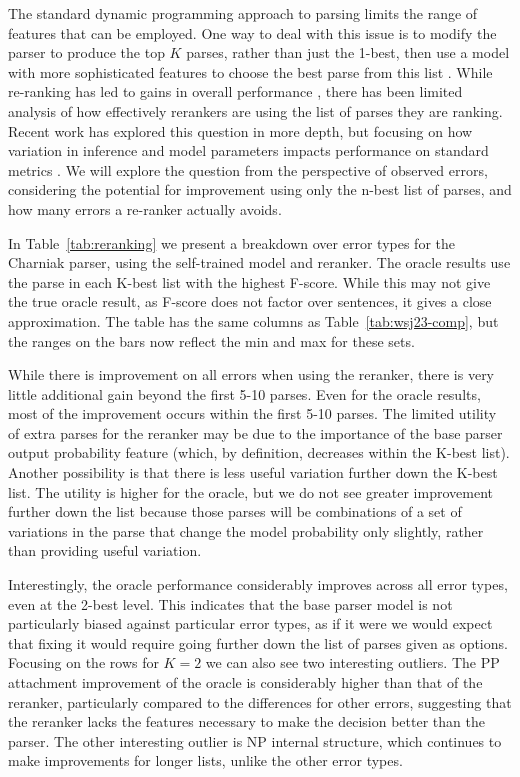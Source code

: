 The standard dynamic programming approach to parsing limits the range of features that can be employed.
One way to deal with this issue is to modify the parser to produce the top $K$ parses, rather than just the 1-best, then use a model with more sophisticated features to choose the best parse from this list \parencite{collins:00}.
While re-ranking has led to gains in overall performance \parencite{Charniak-Johnson:2005}, there has been limited analysis of how effectively rerankers are using the list of parses they are ranking.
Recent work has explored this question in more depth, but focusing on how variation in inference and model parameters impacts performance on standard metrics \parencite{huang:08a,Ng-etal:2010,Auli-Lopez:2011,Ng-Curran:2012}.
We will explore the question from the perspective of observed errors, considering the potential for improvement using only the n-best list of parses, and how many errors a re-ranker actually avoids.

In Table~\ref{tab:reranking} we present a breakdown over error types for the
Charniak parser, using the self-trained model and reranker.  The oracle results
use the parse in each K-best list with the highest F-score.  While this may not
give the true oracle result, as F-score does not factor over sentences, it
gives a close approximation.  The table has the same columns as
Table~\ref{tab:wsj23-comp}, but the ranges on the bars now reflect the min and
max for these sets.

While there is improvement on all errors when using the reranker, there is very
little additional gain beyond the first 5-10 parses.  Even for the oracle
results, most of the improvement occurs within the first 5-10 parses.  The
limited utility of extra parses for the reranker may be due to the importance
of the base parser output probability feature (which, by definition, decreases
within the K-best list).
Another possibility is that there is less useful variation further down the K-best list.
The utility is higher for the oracle, but we do not see greater improvement further down the list because those parses will be combinations of a set of variations in the parse that change the model probability only slightly, rather than providing useful variation.

Interestingly, the oracle performance considerably improves across all error types, even at the 2-best level.
This indicates that the base parser model is not particularly biased against particular error types, as if it were we would expect that fixing it would require going further down the list of parses given as options.
Focusing on the rows for $K=2$ we
can also see two interesting outliers.  The PP attachment improvement of the
oracle is considerably higher than that of the reranker, particularly compared
to the differences for other errors, suggesting that the reranker lacks the
features necessary to make the decision better than the parser.  The other
interesting outlier is NP internal structure, which continues to make
improvements for longer lists, unlike the other error types.

